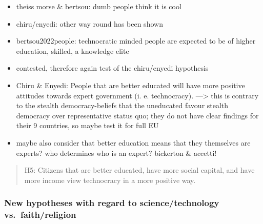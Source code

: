 \documentclass[
  12pt,
  english,
]{article}
\providecommand{\tightlist}{%
  \setlength{\itemsep}{0pt}\setlength{\parskip}{0pt}}
\begin{document}
\begin{itemize}
\tightlist
\item
  theiss morse \& bertsou: dumb people think it is cool
\item
  chiru/enyedi: other way round has been shown
\item
  bertsou2022people: technocratic minded people are expected to be of
  higher education, skilled, a knowledge elite
\item
  contested, therefore again test of the chiru/enyedi hypothesis
\item
  Chiru \& Enyedi: People that are better educated will have more
  positive attitudes towards expert government (i. e. technocracy).
  ---\textgreater{} this is contrary to the stealth democracy-beliefs
  that the uneducated favour stealth democracy over representative
  status quo; they do not have clear findings for their 9 countries, so
  maybe test it for full EU
\item
  maybe also consider that better education means that they themselves
  are experts? who determines who is an expert? bickerton \& accetti!
\end{itemize}

\begin{quote}
H5: Citizens that are better educated, have more social capital, and
have more income view technocracy in a more positive way.
\end{quote}

\hypertarget{new-hypotheses-with-regard-to-sciencetechnology-vs.-faithreligion}{%
\subsubsection{New hypotheses with regard to science/technology
vs.~faith/religion}\label{new-hypotheses-with-regard-to-sciencetechnology-vs.-faithreligion}}
\end{document}
